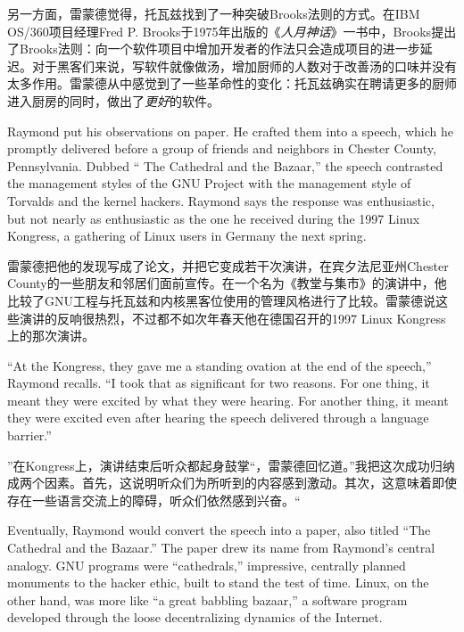 \ifdefined\chs
另一方面，雷蒙德觉得，托瓦兹找到了一种突破Brooks法则的方式。在IBM OS/360项目经理Fred P. Brooks于1975年出版的《\textit{人月神话}》一书中，Brooks提出了Brooks法则：向一个软件项目中增加开发者的作法只会造成项目的进一步延迟。对于黑客们来说，写软件就像做汤，增加厨师的人数对于改善汤的口味并没有太多作用。雷蒙德从中感觉到了一些革命性的变化：托瓦兹确实在聘请更多的厨师进入厨房的同时，做出了\textit{更好}的软件。
\fi

\ifdefined\eng
Raymond put his observations on paper. He crafted them into a speech, which he promptly delivered before a group of friends and neighbors in Chester County, Pennsylvania. Dubbed `` The Cathedral and the Bazaar,'' the speech contrasted the management styles of the GNU Project with the management style of Torvalds and the kernel hackers. Raymond says the response was enthusiastic, but not nearly as enthusiastic as the one he received during the 1997 Linux Kongress, a gathering of Linux users in Germany the next spring.
\fi

\ifdefined\chs
雷蒙德把他的发现写成了论文，并把它变成若干次演讲，在宾夕法尼亚州Chester County的一些朋友和邻居们面前宣传。在一个名为《教堂与集市》的演讲中，他比较了GNU工程与托瓦兹和内核黑客位使用的管理风格进行了比较。雷蒙德说这些演讲的反响很热烈，不过都不如次年春天他在德国召开的1997 Linux Kongress上的那次演讲。
\fi

\ifdefined\eng
``At the Kongress, they gave me a standing ovation at the end of the speech,'' Raymond recalls. ``I took that as significant for two reasons. For one thing, it meant they were excited by what they were hearing. For another thing, it meant they were excited even after hearing the speech delivered through a language barrier.''
\fi

\ifdefined\chs
''在Kongress上，演讲结束后听众都起身鼓掌``，雷蒙德回忆道。''我把这次成功归纳成两个因素。首先，这说明听众们为所听到的内容感到激动。其次，这意味着即使存在一些语言交流上的障碍，听众们依然感到兴奋。``
\fi

\ifdefined\eng
Eventually, Raymond would convert the speech into a paper, also titled ``The Cathedral and the Bazaar.'' The paper drew its name from Raymond's central analogy. GNU programs were ``cathedrals,'' impressive, centrally planned monuments to the hacker ethic, built to stand the test of time. Linux, on the other hand, was more like ``a great babbling bazaar,'' a software program developed through the loose decentralizing dynamics of the Internet.
\fi

